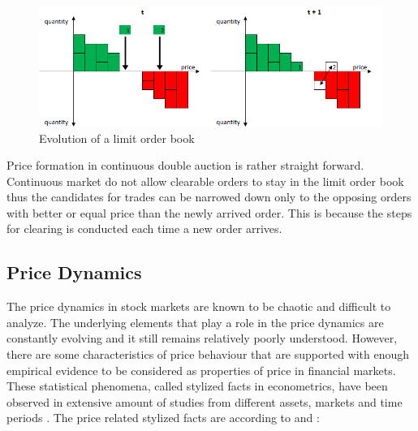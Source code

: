 \begin{figure}
    \begin{center}  
        \includegraphics[width=15cm]{diagrams/lob_evolution.png}
        \caption{Evolution of a limit order book}
        \label{fig:lob_evo}
    \end{center}
\end{figure}

Price formation in continuous double auction is rather straight forward. Continuous
market do not allow clearable orders to stay in the limit order book thus the
candidates for trades can be narrowed down only to the opposing orders with better
or equal price than the newly arrived order. This is because the steps for 
clearing is conducted each time a new order arrives.





\subsection{Price Dynamics}
The price dynamics in stock markets are known to be chaotic and difficult to 
analyze. The underlying elements that play a role in the price dynamics
are constantly evolving and it still remains relatively poorly understood.
However, there are some characteristics of price behaviour that are supported
with enough empirical evidence to be considered as properties of price in
financial markets. These statistical phenomena, called stylized facts in
econometrics, have been observed in extensive amount of studies from 
different assets, markets and time periods \citep{Shakeel18}. 
The price related stylized facts are according to \citet{StylizedFacts01} and \citet{lob13}:

